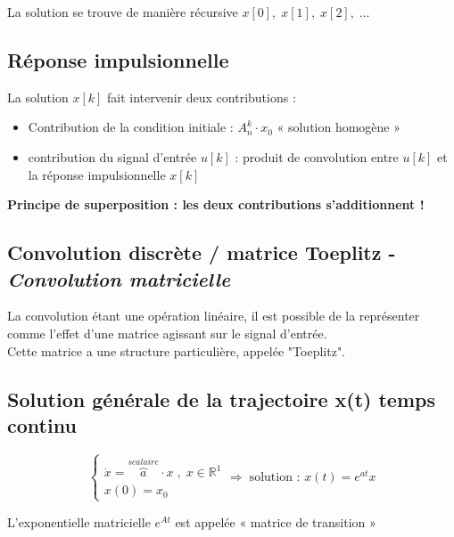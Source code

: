 \documentclass[document.tex]{subfiles}
\begin{document}
La solution se trouve de manière récursive $x[0],\;x[1],\;x[2],\;\ldots$ 


\subsection{Réponse impulsionnelle}


La solution $x[k]$ fait intervenir deux contributions :\\
\begin{itemize}
\item Contribution de la condition initiale : $A_n^k \cdot x_0$   « solution homogène »
\item contribution du signal d'entrée $u[k]$ : produit de convolution entre $u[k]$ et la réponse impulsionnelle $x[k]$
\end{itemize}
\textbf{Principe de superposition : les deux contributions s'additionnent !}


\subsection{Convolution discrète / matrice Toeplitz - \textit{Convolution matricielle}}
La convolution étant une opération linéaire, il est possible de la représenter comme l'effet d'une matrice agissant sur le signal d'entrée.\\

Cette matrice a une structure particulière, appelée "Toeplitz".\\


\subsection{Solution générale de la trajectoire x(t) temps continu }

\begin{equation}
\begin{cases}
 \dot{x} = \overbrace{a}^{scalaire} \cdot x \; , \; x \in \mathbb{R}^1 \\
 x(0) = x_0
\end{cases} \Rightarrow \; \text{solution : } x(t)=e^{a t}x
\end{equation}


L'exponentielle matricielle $e^{At}$ est appelée « matrice de transition »
\end{document}
